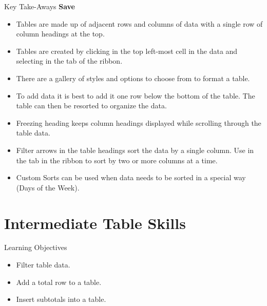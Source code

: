 \begin{center}
	\begin{tkwbox}{Key Take-Aways}
		\textbf{Save}
		\\
		\begin{itemize}
			\setlength{\itemsep}{0pt}
			\setlength{\parskip}{0pt}
			\setlength{\parsep}{0pt}

			\item Tables are made up of adjacent rows and columns of data with a single row of column headings at the top.
			\item Tables are created by clicking in the top left-most cell in the data and selecting  in the  tab of the ribbon.
			\item There are a gallery of styles and options to choose from to format a table.
			\item To add data it is best to add it one row below the bottom of the table. The table can then be resorted to organize the data.
			\item Freezing heading keeps column headings displayed while scrolling through the table data.
			\item Filter arrows in the table headings sort the data by a single column. Use  in the  tab in the ribbon to sort by two or more columns at a time.
			\item Custom Sorts can be used when data needs to be sorted in a special way (\ie Days of the Week).
			
		\end{itemize}
	\end{tkwbox}
\end{center}

\section{Intermediate Table Skills}

\begin{center}
	\begin{objbox}{Learning Objectives}
		\begin{itemize}
			\setlength{\itemsep}{0pt}
			\setlength{\parskip}{0pt}
			\setlength{\parsep}{0pt}

			\item Filter table data.
			\item Add a total row to a table.
			\item Insert subtotals into a table.
			
		\end{itemize}
	\end{objbox}
\end{center}

